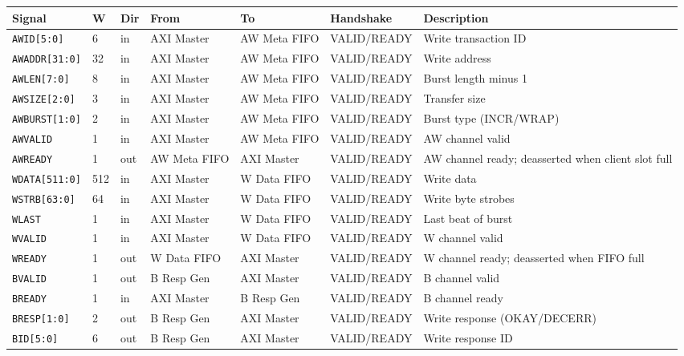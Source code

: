 \documentclass[11pt,a4paper]{article}
\begin{document}
\keepXColumns
\begin{tabularx}{\textwidth}{L{3.0cm} C{0.8cm} C{1.0cm} L{2.2cm} L{2.2cm} L{2.0cm} X}
\toprule
\textbf{Signal} & \textbf{W} & \textbf{Dir} & \textbf{From} & \textbf{To} & \textbf{Handshake} & \textbf{Description} \\
\midrule
\texttt{AWID[5:0]}     & 6   & in  & AXI Master & AW Meta FIFO & VALID/READY & Write transaction ID \\
\texttt{AWADDR[31:0]}  & 32  & in  & AXI Master & AW Meta FIFO & VALID/READY & Write address \\
\texttt{AWLEN[7:0]}    & 8   & in  & AXI Master & AW Meta FIFO & VALID/READY & Burst length minus 1 \\
\texttt{AWSIZE[2:0]}   & 3   & in  & AXI Master & AW Meta FIFO & VALID/READY & Transfer size \\
\texttt{AWBURST[1:0]}  & 2   & in  & AXI Master & AW Meta FIFO & VALID/READY & Burst type (INCR/WRAP) \\
\texttt{AWVALID}       & 1   & in  & AXI Master & AW Meta FIFO & VALID/READY & AW channel valid \\
\texttt{AWREADY}       & 1   & out & AW Meta FIFO & AXI Master  & VALID/READY & AW channel ready; deasserted when client slot full \\
\midrule
\texttt{WDATA[511:0]}  & 512 & in  & AXI Master & W Data FIFO  & VALID/READY & Write data \\
\texttt{WSTRB[63:0]}   & 64  & in  & AXI Master & W Data FIFO  & VALID/READY & Write byte strobes \\
\texttt{WLAST}         & 1   & in  & AXI Master & W Data FIFO  & VALID/READY & Last beat of burst \\
\texttt{WVALID}        & 1   & in  & AXI Master & W Data FIFO  & VALID/READY & W channel valid \\
\texttt{WREADY}        & 1   & out & W Data FIFO  & AXI Master  & VALID/READY & W channel ready; deasserted when FIFO full \\
\midrule
\texttt{BVALID}        & 1   & out & B Resp Gen  & AXI Master  & VALID/READY & B channel valid \\
\texttt{BREADY}        & 1   & in  & AXI Master  & B Resp Gen  & VALID/READY & B channel ready \\
\texttt{BRESP[1:0]}    & 2   & out & B Resp Gen  & AXI Master  & VALID/READY & Write response (OKAY/DECERR) \\
\texttt{BID[5:0]}      & 6   & out & B Resp Gen  & AXI Master  & VALID/READY & Write response ID \\

\end{tabularx}
\end{document}

